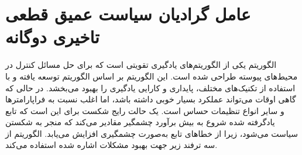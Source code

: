 \section{عامل گرادیان سیاست عمیق قطعی تاخیری دوگانه}
الگوریتم
 یکی از الگوریتم‌های یادگیری تقویتی است که برای حل مسائل کنترل در محیط‌های پیوسته طراحی شده است. این الگوریتم بر اساس الگوریتم  توسعه یافته و با استفاده از تکنیک‌های مختلف، پایداری و کارایی یادگیری را بهبود می‌بخشد.
 در حالی که  گاهی اوقات می‌تواند عملکرد بسیار خوبی داشته باشد، اما اغلب نسبت به فراپارامترها و سایر انواع تنظیمات حساس است. یک حالت رایج شکست برای  این است که تابع  یادگرفته شده شروع به بیش برآورد چشمگیر مقادیر  می‌کند که منجر به شکستن سیاست می‌شود، زیرا از خطاهای تابع  به‌صورت چشمگیری افزایش می‌یابد.
 الگوریتم
از سه ترفند زیر جهت بهبود مشکلات اشاره شده استفاده می‌کند.
